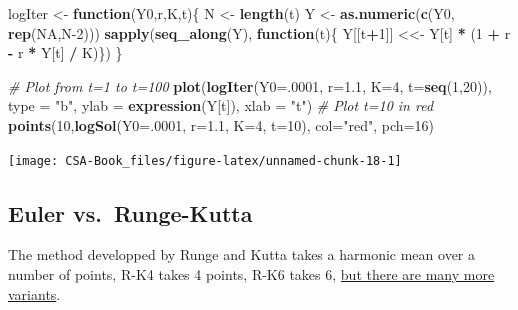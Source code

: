 \documentclass[12pt,]{book}
\newenvironment{Shaded}{\begin{snugshade}}{\end{snugshade}}
\newcommand{\CommentTok}[1]{\textcolor[rgb]{0.56,0.35,0.01}{\textit{#1}}}
\newcommand{\ControlFlowTok}[1]{\textcolor[rgb]{0.13,0.29,0.53}{\textbf{#1}}}
\newcommand{\DataTypeTok}[1]{\textcolor[rgb]{0.13,0.29,0.53}{#1}}
\newcommand{\DecValTok}[1]{\textcolor[rgb]{0.00,0.00,0.81}{#1}}
\newcommand{\FloatTok}[1]{\textcolor[rgb]{0.00,0.00,0.81}{#1}}
\newcommand{\KeywordTok}[1]{\textcolor[rgb]{0.13,0.29,0.53}{\textbf{#1}}}
\newcommand{\NormalTok}[1]{#1}
\newcommand{\OperatorTok}[1]{\textcolor[rgb]{0.81,0.36,0.00}{\textbf{#1}}}
\newcommand{\OtherTok}[1]{\textcolor[rgb]{0.56,0.35,0.01}{#1}}
\newcommand{\StringTok}[1]{\textcolor[rgb]{0.31,0.60,0.02}{#1}}
\begin{document}
\begin{Shaded}
\begin{Highlighting}[]
\NormalTok{logIter <-}\StringTok{  }\ControlFlowTok{function}\NormalTok{(Y0,r,K,t)\{}
\NormalTok{  N <-}\StringTok{ }\KeywordTok{length}\NormalTok{(t)}
\NormalTok{  Y <-}\StringTok{ }\KeywordTok{as.numeric}\NormalTok{(}\KeywordTok{c}\NormalTok{(Y0, }\KeywordTok{rep}\NormalTok{(}\OtherTok{NA}\NormalTok{,N}\DecValTok{-2}\NormalTok{)))}
  \KeywordTok{sapply}\NormalTok{(}\KeywordTok{seq_along}\NormalTok{(Y), }\ControlFlowTok{function}\NormalTok{(t)\{ Y[[t}\OperatorTok{+}\DecValTok{1}\NormalTok{]] <<-}\StringTok{ }\NormalTok{Y[t] }\OperatorTok{*}\StringTok{ }\NormalTok{(}\DecValTok{1} \OperatorTok{+}\StringTok{ }\NormalTok{r }\OperatorTok{-}\StringTok{ }\NormalTok{r }\OperatorTok{*}\StringTok{ }\NormalTok{Y[t] }\OperatorTok{/}\StringTok{ }\NormalTok{K)\})}
\NormalTok{  \}}

\CommentTok{# Plot from t=1 to t=100}
\KeywordTok{plot}\NormalTok{(}\KeywordTok{logIter}\NormalTok{(}\DataTypeTok{Y0=}\NormalTok{.}\DecValTok{0001}\NormalTok{, }\DataTypeTok{r=}\FloatTok{1.1}\NormalTok{, }\DataTypeTok{K=}\DecValTok{4}\NormalTok{, }\DataTypeTok{t=}\KeywordTok{seq}\NormalTok{(}\DecValTok{1}\NormalTok{,}\DecValTok{20}\NormalTok{)), }\DataTypeTok{type =} \StringTok{"b"}\NormalTok{, }
     \DataTypeTok{ylab =} \KeywordTok{expression}\NormalTok{(Y[t]), }\DataTypeTok{xlab =} \StringTok{"t"}\NormalTok{)}
\CommentTok{# Plot t=10 in red}
\KeywordTok{points}\NormalTok{(}\DecValTok{10}\NormalTok{,}\KeywordTok{logSol}\NormalTok{(}\DataTypeTok{Y0=}\NormalTok{.}\DecValTok{0001}\NormalTok{, }\DataTypeTok{r=}\FloatTok{1.1}\NormalTok{, }\DataTypeTok{K=}\DecValTok{4}\NormalTok{, }\DataTypeTok{t=}\DecValTok{10}\NormalTok{), }\DataTypeTok{col=}\StringTok{"red"}\NormalTok{, }\DataTypeTok{pch=}\DecValTok{16}\NormalTok{)}
\end{Highlighting}
\end{Shaded}

\begin{center}\texttt{[image: CSA-Book\_files/figure-latex/unnamed-chunk-18-1]} \end{center}

\hypertarget{euler-vs.runge-kutta}{%
\subsection{Euler vs.~Runge-Kutta}\label{euler-vs.runge-kutta}}

The method developped by Runge and Kutta takes a harmonic mean over a number of points, R-K4 takes 4 points, R-K6 takes 6, \href{https://en.wikipedia.org/wiki/Runge–Kutta_methods}{but there are many more variants}.
\end{document}
